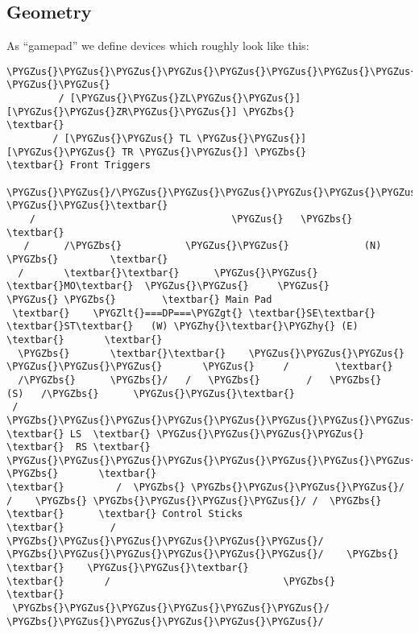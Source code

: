 \documentclass[a4paper,8pt,english]{sphinxmanual}
\def\PYGZbs{\char`\\}
\def\PYGZus{\char`\_}
\def\PYGZlt{\char`\<}
\def\PYGZgt{\char`\>}
\def\PYGZhy{\char`\-}
\begin{document}
\subsection{Geometry}
\label{input/gamepad:geometry}
As ``gamepad'' we define devices which roughly look like this:

\begin{Verbatim}[commandchars=\\\{\}]
          \PYGZus{}\PYGZus{}\PYGZus{}\PYGZus{}\PYGZus{}\PYGZus{}\PYGZus{}\PYGZus{}\PYGZus{}\PYGZus{}\PYGZus{}\PYGZus{}\PYGZus{}\PYGZus{}\PYGZus{}\PYGZus{}\PYGZus{}\PYGZus{}\PYGZus{}\PYGZus{}\PYGZus{}\PYGZus{}\PYGZus{}\PYGZus{}\PYGZus{}\PYGZus{}\PYGZus{}\PYGZus{}              \PYGZus{}\PYGZus{}
         / [\PYGZus{}\PYGZus{}ZL\PYGZus{}\PYGZus{}]          [\PYGZus{}\PYGZus{}ZR\PYGZus{}\PYGZus{}] \PYGZbs{}               \textbar{}
        / [\PYGZus{}\PYGZus{} TL \PYGZus{}\PYGZus{}]        [\PYGZus{}\PYGZus{} TR \PYGZus{}\PYGZus{}] \PYGZbs{}              \textbar{} Front Triggers
     \PYGZus{}\PYGZus{}/\PYGZus{}\PYGZus{}\PYGZus{}\PYGZus{}\PYGZus{}\PYGZus{}\PYGZus{}\PYGZus{}\PYGZus{}\PYGZus{}\PYGZus{}\PYGZus{}\PYGZus{}\PYGZus{}\PYGZus{}\PYGZus{}\PYGZus{}\PYGZus{}\PYGZus{}\PYGZus{}\PYGZus{}\PYGZus{}\PYGZus{}\PYGZus{}\PYGZus{}\PYGZus{}\PYGZus{}\PYGZus{}\PYGZus{}\PYGZus{}\PYGZus{}\PYGZus{}\PYGZbs{}\PYGZus{}\PYGZus{}         \PYGZus{}\PYGZus{}\textbar{}
    /                                  \PYGZus{}   \PYGZbs{}          \textbar{}
   /      /\PYGZbs{}           \PYGZus{}\PYGZus{}             (N)   \PYGZbs{}         \textbar{}
  /       \textbar{}\textbar{}      \PYGZus{}\PYGZus{}  \textbar{}MO\textbar{}  \PYGZus{}\PYGZus{}     \PYGZus{}       \PYGZus{} \PYGZbs{}        \textbar{} Main Pad
 \textbar{}    \PYGZlt{}===DP===\PYGZgt{} \textbar{}SE\textbar{}      \textbar{}ST\textbar{}   (W) \PYGZhy{}\textbar{}\PYGZhy{} (E) \textbar{}       \textbar{}
  \PYGZbs{}       \textbar{}\textbar{}    \PYGZus{}\PYGZus{}\PYGZus{}          \PYGZus{}\PYGZus{}\PYGZus{}       \PYGZus{}     /        \textbar{}
  /\PYGZbs{}      \PYGZbs{}/   /   \PYGZbs{}        /   \PYGZbs{}     (S)   /\PYGZbs{}      \PYGZus{}\PYGZus{}\textbar{}
 /  \PYGZbs{}\PYGZus{}\PYGZus{}\PYGZus{}\PYGZus{}\PYGZus{}\PYGZus{}\PYGZus{}\PYGZus{} \textbar{} LS  \textbar{} \PYGZus{}\PYGZus{}\PYGZus{}\PYGZus{} \textbar{}  RS \textbar{} \PYGZus{}\PYGZus{}\PYGZus{}\PYGZus{}\PYGZus{}\PYGZus{}\PYGZus{}\PYGZus{}/  \PYGZbs{}       \textbar{}
\textbar{}         /  \PYGZbs{} \PYGZbs{}\PYGZus{}\PYGZus{}\PYGZus{}/ /    \PYGZbs{} \PYGZbs{}\PYGZus{}\PYGZus{}\PYGZus{}/ /  \PYGZbs{}         \textbar{}      \textbar{} Control Sticks
\textbar{}        /    \PYGZbs{}\PYGZus{}\PYGZus{}\PYGZus{}\PYGZus{}\PYGZus{}/      \PYGZbs{}\PYGZus{}\PYGZus{}\PYGZus{}\PYGZus{}\PYGZus{}/    \PYGZbs{}        \textbar{}    \PYGZus{}\PYGZus{}\textbar{}
\textbar{}       /                              \PYGZbs{}       \textbar{}
 \PYGZbs{}\PYGZus{}\PYGZus{}\PYGZus{}\PYGZus{}\PYGZus{}/                                \PYGZbs{}\PYGZus{}\PYGZus{}\PYGZus{}\PYGZus{}\PYGZus{}/


\end{Verbatim}
\end{document}
